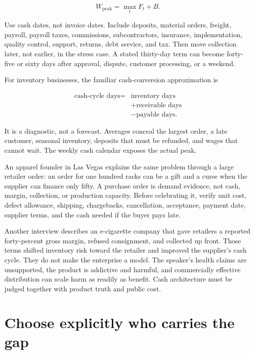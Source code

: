 \begin{equation}
W_{\mathrm{peak}}=\max_t F_t+B.
\end{equation}

Use cash dates, not invoice dates. Include deposits, material orders, freight,
payroll, payroll taxes, commissions, subcontractors, insurance, implementation,
quality control, support, returns, debt service, and tax. Then move collection
later, not earlier, in the stress case. A stated thirty-day term can become
forty-five or sixty days after approval, dispute, customer processing, or a
weekend.

For inventory businesses, the familiar cash-conversion approximation is

\begin{equation}
\begin{aligned}
\text{cash-cycle days}={}&\text{inventory days}\\
&+\text{receivable days}\\
&-\text{payable days}.
\end{aligned}
\end{equation}

It is a diagnostic, not a forecast. Averages conceal the largest order, a late
customer, seasonal inventory, deposits that must be refunded, and wages that
cannot wait. The weekly cash calendar exposes the actual peak.

An apparel founder in Las Vegas explains the same problem through a large
retailer order: an order for one hundred racks can be a gift and a curse when
the supplier can finance only fifty. A purchase order is demand evidence, not
cash, margin, collection, or production capacity. Before celebrating it, verify
unit cost, defect allowance, shipping, chargebacks, cancellation, acceptance,
payment date, supplier terms, and the cash needed if the buyer pays late.

Another interview describes an e-cigarette company that gave retailers a
reported forty-percent gross margin, refused consignment, and collected up
front. Those terms shifted inventory risk toward the retailer and improved the
supplier's cash cycle. They do not make the enterprise a model. The speaker's
health claims are unsupported, the product is addictive and harmful, and
commercially effective distribution can scale harm as readily as benefit.
Cash architecture must be judged together with product truth and public cost.

\section{Choose explicitly who carries the gap}

